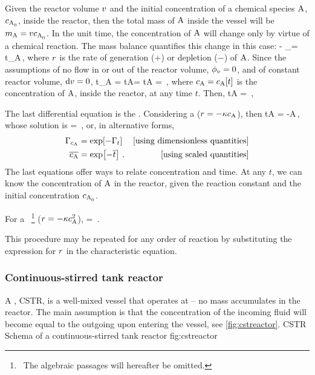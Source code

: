Given the reactor volume $v$ and the initial concentration of a chemical species $\ce A$, $\conc{A,0}$, inside the reactor, then the total mass of $\ce A$ inside the vessel will be $\mass_{\ce A} = \vol\conc{A,0}$. In the unit time, the concentration of $\ce A$ will change only by virtue of a chemical reaction. The mass balance quantifies this change in this case:
\beq
\flow\vol{} - \flow\vol{} \pm \int_\vol\rrate\dx\vol = \iod t\mass_{\ce A}\,,
\eeq
where $r$ is the rate of generation ($+$) or depletion ($-$) of $\ce A$. Since the assumptions of no flow in or out of the reactor volume, $\phi_{v} = 0$, and of constant reactor volume, $\text{d}v = 0$,
\beq
\iod t\mass_{\ce A} = \iod t\conc A\vol = \vol\iod t\conc A = \vol\rrate\,,
\eeq
where $\conc A = \conc A\vat t$ is the concentration of $\ce A$, inside the reactor, at any time $t$. Then,
\beq
\iod t\conc A = \rrate\,,
\eeq

The last differential equation is the . Considering a  ($\rrate = -\krcoeff\conc A$), then
\beq
\iod t\conc A = -\krcoeff\conc A\,,
\eeq
whose solution is
\beq
{} = \exp{}\,,
\eeq
or, in alternative forms,
\begin{align*}
\kdim_{\conc A} &= \exp\vat{-\kdim_t}    & \text{[using dimensionless quantities]} \\
 \scpq{\conc A} &= \exp\vat{-\scpq t}\,. & \text{[using scaled quantities]}
\end{align*}
The last equations offer ways to relate concentration and time. At any $t$, we can know the concentration of $\ce A$ in the reactor, given the reaction constant and the initial concentration $\conc{A,0}$.

For a ~\footnote{~The algebraic passages will hereafter be omitted.} ($\rrate = -\krcoeff\conc A^2$),
\beq
{} = \,.
\eeq

This procedure may be repeated for any order of reaction by substituting the expression for $r$ in the
characteristic equation. 


\subsubsection{Continuous-stirred tank reactor}
A , CSTR, is a well-mixed vessel that operates at  -- no mass accumulates in the reactor. The main assumption is that the concentration of the incoming fluid will become  equal to the outgoing upon entering the vessel, see \cref{fig:cstreactor}.
%
   {CSTR}
   {Schema of a continuous-stirred tank reactor}%
   {fig:cstreactor}%


